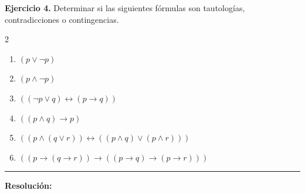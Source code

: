 \hypertarget{ej4}{}
\noindent \textbf{Ejercicio 4.} Determinar si las siguientes fórmulas son tautologías, contradicciones o contingencias.

\begin{multicols}{2}
\begin{enumerate}[label=\alph*)]
    \item $(p \vee \neg p)$
    \item $(p \wedge \neg p)$
    \item $((\neg p \vee q) \leftrightarrow (p \rightarrow q))$
    \item $((p \wedge q) \rightarrow p)$
    \item $((p \wedge (q \vee r)) \leftrightarrow ((p \wedge q) \vee (p \wedge r)))$
    \item $((p \rightarrow (q \rightarrow r)) \rightarrow ((p \rightarrow q) \rightarrow (p \rightarrow r)))$
\end{enumerate}
\end{multicols}

\vspace{0.2cm}
{\color{gray}\hrule}
\vspace{0.4cm}

\textbf{Resolución:}


